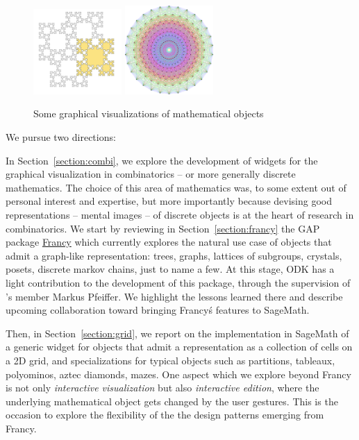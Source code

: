 \documentclass{deliverablereport}
\begin{document}
\begin{figure}
\begin{center}
    \includegraphics[width=0.3\textwidth]{images/619px-Tiling_Fibonacci_word_fractal}
    \hfil
    \includegraphics[width=0.3\textwidth]{images/597px-E8Petrie}
  \end{center}
  \caption{Some graphical visualizations of mathematical objects}
  \label{fig:math_viz}
\end{figure}

We pursue two directions:

In Section~\ref{section:combi}, we explore the development of widgets
for the graphical visualization in combinatorics -- or more generally
discrete mathematics. The choice of this area of mathematics was, to
some extent out of personal interest and expertise, but more
importantly because devising good representations -- mental images --
of discrete objects is at the heart of research in combinatorics. We
start by reviewing in Section~\ref{section:francy} the GAP package
\href{https://github.com/mcmartins/francy}{Francy} which currently
explores the natural use case of objects that admit a graph-like
representation: trees, graphs, lattices of subgroups, crystals,
posets, discrete markov chains, just to name a few. At this stage, ODK
has a light contribution to the development of this package, through
the supervision of \ODK's member Markus Pfeiffer. We highlight the
lessons learned there and describe upcoming collaboration toward
bringing Francy\'s features to SageMath.

Then, in Section~\ref{section:grid}, we report on the implementation
in SageMath of a generic widget for objects that admit a
representation as a collection of cells on a 2D grid, and
specializations for typical objects such as partitions, tableaux,
polyominos, aztec diamonds, mazes. One aspect which we explore beyond
Francy is not only \emph{interactive visualization} but also
\emph{interactive edition}, where the underlying mathematical object
gets changed by the user gestures. This is the occasion to explore the
flexibility of the the design patterns emerging from Francy.
\end{document}
